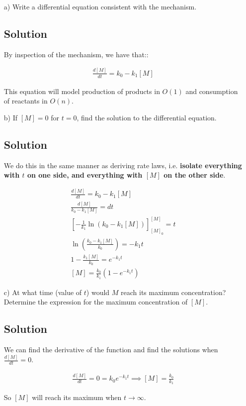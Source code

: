 \documentclass[12pt]{book}
\begin{document}
\begin{itemize}
    \item[a)] Write a differential equation consistent with the mechanism.
    
    \subsection*{Solution}
    By inspection of the mechanism, we have that::

    \begin{align*}
        \frac{d[M]}{dt}=k_0-k_1[M]
    \end{align*}

    This equation will model production of products in $O(1)$ and consumption of reactants in $O(n)$.

    \item[b)] If $[M]=0$ for $t=0$, find the solution to the differential equation. 
    
    \subsection*{Solution}

    We do this in the same manner as deriving rate laws, i.e. \textbf{isolate everything with $t$ on one side, and everything with $[M]$ on the other side}.

    \begin{align}
        \frac{d[M]}{dt}=k_0-k_1[M]\\
        \frac{d[M]}{k_0-k_1[M]}=dt\\
        \left[-\frac{1}{k_1}\ln(k_0-k_1[M])\right]_{[M]_0}^{[M]}=t\\
        \ln\left(\frac{k_0-k_1[M]}{k_0}\right)=-k_1t\\
        1-\frac{k_1[M]}{k_0}=e^{-k_1t}\\
        [M]=\frac{k_0}{k_1}(1-e^{-k_1t})
    \end{align}

    \item[c)] At what time (value of $t$) would $M$ reach its maximum concentration? Determine the
    expression for the maximum concentration of $[M]$.

    \subsection*{Solution}

    We can find the derivative of the function and find the solutions when $\frac{d[M]}{dt}=0$.

    \begin{align*}
        \frac{d[M]}{dt}=0=k_0e^{-k_1t}\implies [M]=\frac{k_0}{k_1}
    \end{align*}

    So $[M]$ will reach its maximum when $t\rightarrow \infty$.

\end{itemize}
\end{document}
